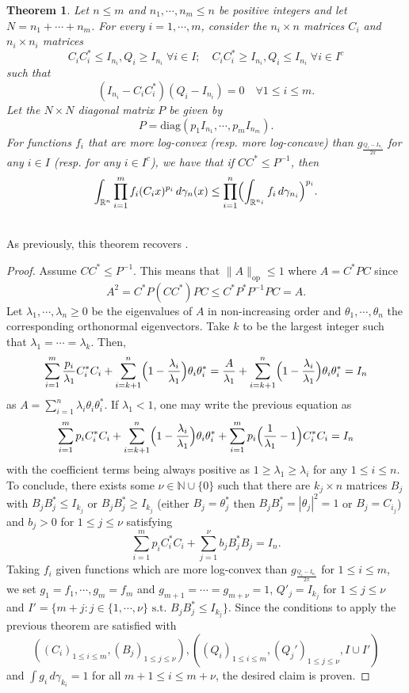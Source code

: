 \documentclass[11pt,a4paper,reqno]{amsart}
\numberwithin{equation}{section}
\newtheorem{theorem}{Theorem}[section]
\theoremstyle{definition}
\newcommand{\<}{\ensuremath \leq}
\renewcommand{\>}{\ensuremath \geq}
\begin{document}
\begin{theorem} \label{Gaussian_Version_BL}
    Let $n \leq m$ and $n_1,\cdots,n_m \leq n$ be positive integers and let $N=n_1+\cdots+n_m$. For every $i=1,\cdots,m$, consider the $n_i \times n$ matrices $C_i$ and $n_i \times n_i$ matrices $$C_iC_i^* \leq I_{n_i}, Q_i \geq I_{n_i} \; \forall i \in I; \quad C_iC_i^* \geq I_{n_i}, Q_i \le I_{n_i} \; \forall i \in I^c$$  such that $$(I_{n_i}-C_iC_i^*)(Q_i-I_{n_i})=0 \quad \forall 1 \le i \le m.$$  Let the $N \times N$ diagonal matrix $P$ be given by  $$P=\mathrm{diag}(p_1I_{n_1},\cdots,p_mI_{n_m}).$$ For functions $f_i$ that are more log-convex (resp. more log-concave) than $g_{\frac{Q_i-I_{n_i}}{2\pi}}$ for any $i \in I$ (resp. for any $i \in I^c$), we have that if $CC^* \leq P^{-1}$, then $$\int_{\mathbb{R}^n}\prod_{i=1}^m f_i(C_ix)^{p_i}\, d\gamma_n(x) \leq \prod_{i=1}^n \Bigl( \int_{\mathbb{R}^{n_i}}f_i\, d\gamma_{n_i} \Bigl)^{p_i}.$$
\end{theorem}

\hfill \\

As previously, this theorem recovers \cite[Theorem 3 (i)]{Chen_Dafnis_Paouris}. 


\begin{proof}
    Assume $CC^* \leq P^{-1}.$ This means that $\|A\|_{\mathrm{op}} \leq 1$ where $A=C^*PC$ since $$A^2=C^*P(CC^*)PC \leq C^*P^*P^{-1}PC=A.$$ Let $\lambda_1,\cdots,\lambda_n \geq 0$ be the eigenvalues of $A$ in non-increasing order and $\theta_1,\cdots,\theta_n$ the corresponding orthonormal eigenvectors. Take $k$ to be the largest integer such that $\lambda_1=\cdots=\lambda_k.$ Then, $$\sum_{i=1}^m \frac{p_i}{\lambda_1}C_i^*C_i+\sum_{i=k+1}^n \Bigl(1-\frac{\lambda_i}{\lambda_1} \Bigl)\theta_i\theta_i^*=\frac{A}{\lambda_1}+\sum_{i=k+1}^n \Bigl(1-\frac{\lambda_i}{\lambda_1} \Bigl)\theta_i\theta_i^*=I_n$$ as $A=\sum_{i=1}^n \lambda_i \theta_i \theta_i^*.$ If $\lambda_1<1$, one may write the previous equation as $$\sum_{i=1}^m p_iC_i^*C_i+\sum_{i=k+1}^n \Bigl(1-\frac{\lambda_i}{\lambda_1}\Bigl)\theta_i\theta_i^*+\sum_{i=1}^m p_i\Bigl(\frac{1}{\lambda_1}-1\Bigl)C_i^*C_i=I_n$$ with the coefficient terms being always positive as $1 \geq \lambda_1 \geq \lambda_i$ for any $1 \leq i \leq n.$  To conclude, there exists some $\nu \in \mathbb{N} \cup \{0\}$ such that there are $k_j \times n$ matrices $B_j$ with $B_jB_j^* \leq I_{k_j}$ or $B_jB_j^* \geq I_{k_j}$ (either $B_j=\theta_j^*$ then $B_jB_j^*=|\theta_j|^2=1$ or $B_j=C_{i_j}$) and $b_j>0$ for $1 \leq j \leq \nu$ satisfying $$\sum_{i=1}^m p_iC_i^*C_i+\sum_{j=1}^\nu b_jB_j^*B_j=I_n.$$ Taking $f_i$ given functions which are more log-convex than $g_{\frac{Q_i-I_{n_i}}{2\pi}}$ for $1 \leq i \leq m$, we set $g_1=f_1,\cdots,g_m=f_m$ and $g_{m+1}=\cdots=g_{m+\nu}=1$,  $Q'_j=I_{k_j}$ for $1 \leq j \leq \nu$ and $I'=\{m+j: j \in \{1,\cdots,\nu\} \text{ s.t. }  B_jB_j^* \le I_{k_j}\}.$ Since the conditions to apply the previous theorem are satisfied with $$((C_i)_{1 \leq i \leq m},(B_j)_{1 \leq j \leq \nu}), ((Q_i)_{1 \leq i \leq m},(Q_j')_{1 \leq j \leq \nu},I \cup I')$$ and $\int g_{i}\, d\gamma_{k_i}=1$ for all $m+1 \leq i \leq m+\nu$, the desired claim is proven. 
\end{proof}
\end{document}
